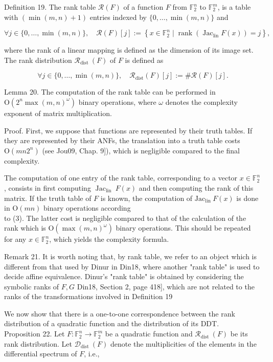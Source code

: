 \documentclass[10pt]{article}
\begin{document}
Definition 19. The rank table $\mathcal{R}(F)$ of a function $F$ from $\mathbb{F}_{2}^{n}$ to $\mathbb{F}_{2}^{m}$, is a table with $(\min (m, n)+1)$ entries indexed by $\{0, \ldots, \min (m, n)\}$ and

$$
\forall j \in\{0, \ldots, \min (m, n)\}, \quad \mathcal{R}(F)[j]:=\left\{x \in \mathbb{F}_{2}^{n} \mid \operatorname{rank}\left(\operatorname{Jac}_{\operatorname{lin}} F(x)\right)=j\right\},
$$

where the rank of a linear mapping is defined as the dimension of its image set.\\
The rank distribution $\mathcal{R}_{\text {dist }}(F)$ of $F$ is defined as

$$
\forall j \in\{0, \ldots, \min (m, n)\}, \quad \mathcal{R}_{\mathrm{dist}}(F)[j]:=\# \mathcal{R}(F)[j] .
$$

Lemma 20. The computation of the rank table can be performed in $\mathrm{O}\left(2^{n} \max (m, n)^{\omega}\right)$ binary operations, where $\omega$ denotes the complexity exponent of matrix multiplication.

Proof. First, we suppose that functions are represented by their truth tables. If they are represented by their ANFs, the translation into a truth table costs $\mathrm{O}\left(m n 2^{n}\right)$ (see Jou09, Chap. 9]), which is negligible compared to the final complexity.

The computation of one entry of the rank table, corresponding to a vector $x \in \mathbb{F}_{2}^{n}$, consists in first computing $\operatorname{Jac}_{\text {lin }} F(x)$ and then computing the rank of this matrix. If the truth table of $F$ is known, the computation of $\mathrm{Jac}_{\text {lin }} F(x)$ is done in $\mathrm{O}(m n)$ binary operations according\\
to (3). The latter cost is negligible compared to that of the calculation of the rank which is $\mathrm{O}\left(\max (m, n)^{\omega}\right)$ binary operations. This should be repeated for any $x \in \mathbb{F}_{2}^{n}$, which yields the complexity formula.

Remark 21. It is worth noting that, by rank table, we refer to an object which is different from that used by Dinur in Din18, where another "rank table" is used to decide affine equivalence. Dinur's "rank table" is obtained by considering the symbolic ranks of $F, G$ Din18, Section 2, page 418], which are not related to the ranks of the transformations involved in Definition 19

We now show that there is a one-to-one correspondence between the rank distribution of a quadratic function and the distribution of its DDT.\\
Proposition 22. Let $F: \mathbb{F}_{2}^{n} \rightarrow \mathbb{F}_{2}^{m}$ be a quadratic function and $\mathcal{R}_{\text {dist }}(F)$ be its rank distribution. Let $\mathcal{D}_{\text {dist }}(F)$ denote the multiplicities of the elements in the differential spectrum of $F$, i.e.,
\end{document}
